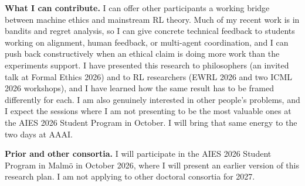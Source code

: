 \documentclass[letterpaper,11pt]{article}
\begin{document}
\textbf{What I can contribute.} I can offer other participants a working bridge between machine ethics and mainstream RL theory. Much of my recent work is in bandits and regret analysis, so I can give concrete technical feedback to students working on alignment, human feedback, or multi-agent coordination, and I can push back constructively when an ethical claim is doing more work than the experiments support. I have presented this research to philosophers (an invited talk at Formal Ethics 2026) and to RL researchers (EWRL 2026 and two ICML 2026 workshops), and I have learned how the same result has to be framed differently for each. I am also genuinely interested in other people's problems, and I expect the sessions where I am not presenting to be the most valuable ones at the AIES 2026 Student Program in October. I will bring that same energy to the two days at AAAI.

\textbf{Prior and other consortia.} I will participate in the AIES 2026 Student Program in Malm\"o in October 2026, where I will present an earlier version of this research plan. I am not applying to other doctoral consortia for 2027.
\end{document}
